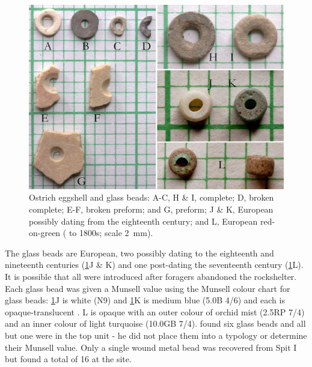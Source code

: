 \documentclass{ijsra}
\begin{document}
 	\begin{figure} %
 		\includegraphics[width=\linewidth]{figures/Forssman-Figure10}
 		\caption{Ostrich eggshell and glass beads: A-C, H \& I, complete; D, broken complete; E-F, broken preform; and G, preform; J \& K, European possibly dating from the eighteenth century; and L, European red-on-green ( to 1800s; scale \SI{2}{\milli\meter}).}
 		\label{fig:Forssman-Figure10}
 	\end{figure}
 
 
 The glass beads are European, two possibly dating to the eighteenth and nineteenth centuries (\cref{fig:Forssman-Figure10}J \& K) 
 and one post-dating the seventeenth century (\cref{fig:Forssman-Figure10}L). 
 It is possible that all were introduced after foragers abandoned the rockshelter. 
 Each glass bead was given a Munsell value using the Munsell colour chart for glass beads: 
 \cref{fig:Forssman-Figure10}J is white (N9) and \cref{fig:Forssman-Figure10}K is medium blue (5.0B 4/6) 
 and each is opaque-translucent 
 \parencite[slight glow of light along edges;][70]{Wood_2011}. 
 L is opaque with an outer colour of orchid mist (2.5RP 7/4) and an inner colour of light turquoise (10.0GB 7/4).  
 \textcite{Walker_1994} found six glass beads and all but one were in the top unit - he did not place them into a typology or determine their Munsell value. 
 Only a single wound metal bead was recovered from Spit I but \textcite{Walker_1994} found a total of 16 at the site.

\end{document}
